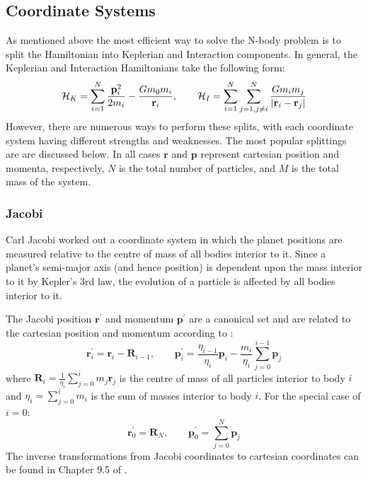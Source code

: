 \subsection{Coordinate Systems}
As mentioned above the most efficient way to solve the N-body  problem is to split the Hamiltonian into Keplerian and Interaction components.
In general, the Keplerian and Interaction Hamiltonians take the following form:
\begin{equation}
\mathcal{H}_K = \sum_{i=1}^N \frac{\textbf{p}_i^2}{2m_i} - \frac{Gm_0m_i}{\textbf{r}_i}, \qquad
\mathcal{H}_I = \sum_{i=1}^{N}\sum_{j=1,j \ne i}^N \frac{Gm_im_j}{|\textbf{r}_i - \textbf{r}_j|}
\label{eq:Hgeneral}
\end{equation}
However, there are numerous ways to perform these splits, with each coordinate system having different strengths and weaknesses. 
The most popular splittings are are discussed below. 
In all cases $\textbf{r}$ and $\textbf{p}$ represent cartesian position and momenta, respectively, $N$ is the total number of particles, and $M$ is the total mass of the system. 

\subsubsection{Jacobi}
\label{sec:Jacobi}
Carl Jacobi worked out a coordinate system in which the planet positions are measured relative to the centre of mass of all bodies interior to it. 
Since a planet's semi-major axis (and hence position) is dependent upon the mass interior to it by Kepler's 3rd law, the evolution of a particle is affected by all bodies interior to it. 

The Jacobi position $\textbf{r}^{\prime}$ and momentum $\textbf{p}^{\prime}$ are a canonical set and are related to the cartesian position and momentum according to \citep{SSD1999}:
\begin{equation}
\textbf{r}^{\prime}_i = \textbf{r}_i - \textbf{R}_{i-1}, \qquad
\textbf{p}^{\prime}_i = \frac{\eta_{i-1}}{\eta_i}\textbf{p}_i - \frac{m_i}{\eta_i}\sum_{j=0}^{i-1} \textbf{p}_j
\end{equation}
where $\textbf{R}_i = \frac{1}{\eta_i} \sum_{j=0}^i m_j\textbf{r}_j$ is the centre of mass of all particles interior to body $i$ and $\eta_i = \sum_{j=0}^i m_i$ is the sum of masses interior to body $i$.
For the special case of $i=0$:
\begin{equation}
\textbf{r}^{\prime}_0 = \textbf{R}_{N}, \qquad
\textbf{p}^{\prime}_0 = \sum_{j=0}^{N} \textbf{p}_j
\end{equation}
The inverse transformations from Jacobi coordinates to cartesian coordinates can be found in Chapter 9.5 of \citet{SSD1999}.

